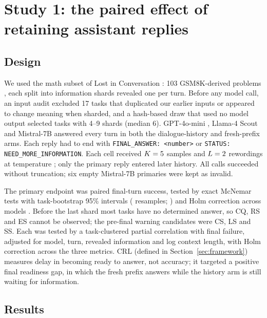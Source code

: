 \section{Study 1: the paired effect of retaining assistant replies}
\label{sec:study1}

\subsection{Design}

We used the math subset of Lost in Conversation \citep{laban2025lost}: 103
GSM8K-derived problems \citep{cobbe2021training}, each split into information
shards revealed one per turn. Before any model call, an input audit excluded 17
tasks that duplicated our earlier inputs or appeared to change meaning when
sharded, and a hash-based draw that used no model output selected \nTasks{}
tasks with 4--9 shards (median 6). GPT-4o-mini \citep{openai2024gpt4o}, Llama-4
Scout and Mistral-7B \citep{jiang2023mistral} answered every turn in both the
dialogue-history and fresh-prefix arms. Each reply had to end with
\texttt{FINAL\_ANSWER: <number>} or \texttt{STATUS: NEED\_MORE\_INFORMATION}.
Each cell received $K=5{}$ samples and $L=2{}$ rewordings at
temperature \Ktemp{}; only the primary reply entered later history. All
\nRecords{} calls succeeded without truncation; six empty Mistral-7B primaries
were kept as invalid.

The primary endpoint was paired final-turn success, tested by exact McNemar
tests \citep{mcnemar1947note} with task-bootstrap 95\% intervals
(\nPermutations{} resamples; \citealp{efron1979bootstrap}) and Holm correction
across models \citep{holm1979simple}. Before the last shard most tasks have no
determined answer, so CQ, RS and ES cannot be observed; the pre-final warning
candidates were CS, LS and SS. Each was tested by a task-clustered partial
correlation with final failure, adjusted for model, turn, revealed information
and log context length, with Holm correction across the three metrics. CRL
(defined in Section~\ref{sec:framework}) measures delay in becoming ready to
answer, not accuracy; it targeted a positive final readiness gap, in which the
fresh prefix answers while the history arm is still waiting for information.

\subsection{Results}


